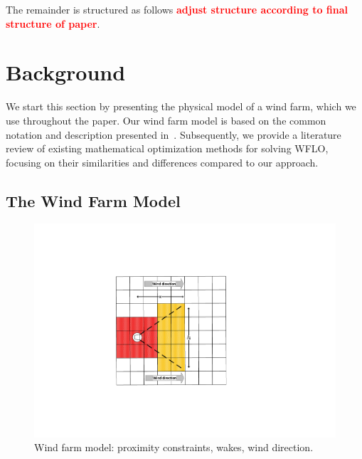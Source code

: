 \documentclass[preprint,12pt]{elsarticle}
\newcommand{\todo}[1]{{\textcolor{red}{\bf {#1}}}}
\begin{document}
The remainder is structured as follows \todo{adjust structure according to final structure of paper}. 


\section{Background}
\label{sec:related}

We start this section
by presenting the
physical model 
of a wind farm, which we use throughout the paper.
Our wind farm model is based on
the common notation and description 
presented in~\cite{Zhang2014}.  
Subsequently, we provide a literature review of 
existing mathematical
optimization methods for solving WFLO, focusing
on their similarities and differences
compared to our approach.
 
\subsection{The Wind Farm Model}
\begin{figure}[t]
	\centering
	\includegraphics[scale = 0.9]{field_model.pdf}

	\caption{Wind farm model: proximity constraints, wakes, wind direction.}\label{fig:field_model}
\end{figure}
\end{document}
